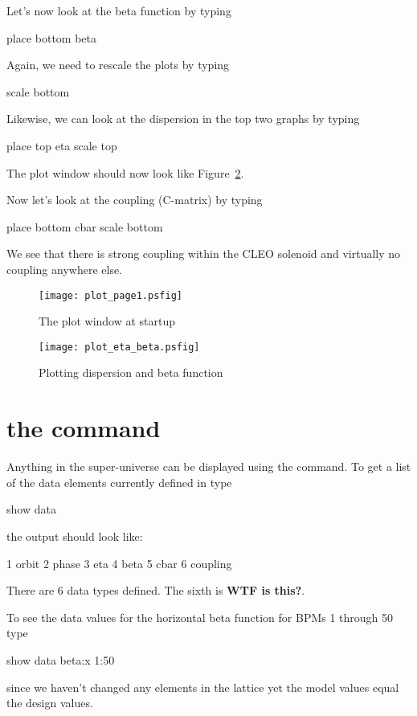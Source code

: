 \documentclass{book}
\begin{document}
Let's now look at the beta function by typing
\begin{example}
  place bottom beta
\end{example}
Again, we need to rescale the plots by typing
\begin{example}
  scale bottom
\end{example}

Likewise, we can look at the dispersion in the top two graphs by typing
\begin{example}
  place top eta
  scale top
\end{example}
The plot window should now look like Figure~\ref{f:plot_eta_beta}.

Now let's look at the coupling (C-matrix) by typing
\begin{example}
  place bottom cbar
  scale bottom
\end{example}
We see that there is strong coupling within the CLEO solenoid and virtually no
coupling anywhere else.

\begin{figure}
  \centering
  \texttt{[image: plot\_page1.psfig]}
  \caption{The plot window at startup}
  \label{f:plot_begin}
\end{figure}

\begin{figure}
  \centering
  \texttt{[image: plot\_eta\_beta.psfig]}
  \caption{Plotting dispersion and beta function}
  \label{f:plot_eta_beta}
\end{figure}

\section{the  command}

Anything in the super-universe can be displayed using the  command. To
get a list of the data elements currently defined in \tao type
\begin{example}
  show data
\end{example}
the output should look like:
\begin{example}
   1  orbit
   2  phase
   3  eta
   4  beta
   5  cbar
   6  coupling
\end{example}
There are 6 data types defined. The sixth is \textbf{WTF is this?}. 

To see the data values for the horizontal beta function for \cesr BPMs 1 through
50 type
\begin{example}
  show data beta:x 1:50
\end{example}
since we haven't changed any elements in the lattice yet the model values equal
the design values.
\end{document}
